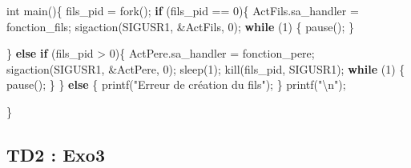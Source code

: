 \documentclass[
]{article}
\newenvironment{Shaded}{}{}
\newcommand{\ControlFlowTok}[1]{\textcolor[rgb]{0.00,0.44,0.13}{\textbf{#1}}}
\newcommand{\DataTypeTok}[1]{\textcolor[rgb]{0.56,0.13,0.00}{#1}}
\newcommand{\DecValTok}[1]{\textcolor[rgb]{0.25,0.63,0.44}{#1}}
\newcommand{\NormalTok}[1]{#1}
\newcommand{\SpecialCharTok}[1]{\textcolor[rgb]{0.25,0.44,0.63}{#1}}
\newcommand{\StringTok}[1]{\textcolor[rgb]{0.25,0.44,0.63}{#1}}
\begin{document}
\begin{Shaded}
\begin{Highlighting}[]
\DataTypeTok{int}\NormalTok{ main()\{}
\NormalTok{    fils\_pid = fork();}
    \ControlFlowTok{if}\NormalTok{ (fils\_pid == }\DecValTok{0}\NormalTok{)\{}
\NormalTok{        ActFils.sa\_handler = fonction\_fils;}
\NormalTok{        sigaction(SIGUSR1, \&ActFils, }\DecValTok{0}\NormalTok{);}
        \ControlFlowTok{while}\NormalTok{ (}\DecValTok{1}\NormalTok{)}
\NormalTok{        \{}
\NormalTok{            pause();}
\NormalTok{        \}}
        
\NormalTok{    \} }\ControlFlowTok{else} \ControlFlowTok{if}\NormalTok{ (fils\_pid \textgreater{} }\DecValTok{0}\NormalTok{)\{}
\NormalTok{        ActPere.sa\_handler = fonction\_pere;}
\NormalTok{        sigaction(SIGUSR1, \&ActPere, }\DecValTok{0}\NormalTok{);}
\NormalTok{        sleep(}\DecValTok{1}\NormalTok{);}
\NormalTok{        kill(fils\_pid, SIGUSR1);}
        \ControlFlowTok{while}\NormalTok{ (}\DecValTok{1}\NormalTok{)}
\NormalTok{        \{}
\NormalTok{            pause();}
\NormalTok{        \}}
\NormalTok{    \} }\ControlFlowTok{else}\NormalTok{ \{}
\NormalTok{        printf(}\StringTok{"Erreur de création du fils"}\NormalTok{);}
\NormalTok{    \}}
\NormalTok{    printf(}\StringTok{"}\SpecialCharTok{\textbackslash{}n}\StringTok{"}\NormalTok{);}

\NormalTok{\}}
\end{Highlighting}
\end{Shaded}

\hypertarget{td2-exo3}{%
\subsection{TD2 : Exo3}\label{td2-exo3}}
\end{document}

